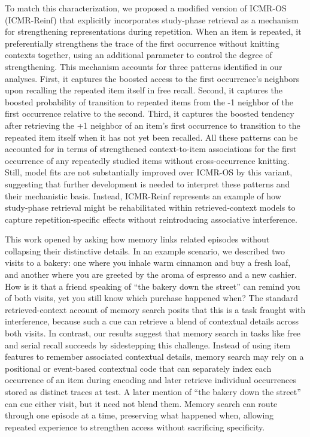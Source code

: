 \documentclass[
  man,
  floatsintext,
  longtable,
  nolmodern,
  notxfonts,
  notimes,
  draftfirst,
  colorlinks=true,linkcolor=blue,citecolor=blue,urlcolor=blue]{apa7}
\begin{document}
To match this characterization, we proposed a modified version of
ICMR-OS (ICMR-Reinf) that explicitly incorporates study-phase retrieval
as a mechanism for strengthening representations during repetition. When
an item is repeated, it preferentially strengthens the trace of the
first occurrence without knitting contexts together, using an additional
parameter to control the degree of strengthening. This mechanism
accounts for three patterns identified in our analyses. First, it
captures the boosted access to the first occurrence's neighbors upon
recalling the repeated item itself in free recall. Second, it captures
the boosted probability of transition to repeated items from the -1
neighbor of the first occurrence relative to the second. Third, it
captures the boosted tendency after retrieving the +1 neighbor of an
item's first occurrence to transition to the repeated item itself when
it has not yet been recalled. All these patterns can be accounted for in
terms of strengthened context-to-item associations for the first
occurrence of any repeatedly studied items without cross-occurrence
knitting. Still, model fits are not substantially improved over ICMR-OS
by this variant, suggesting that further development is needed to
interpret these patterns and their mechanistic basis. Instead,
ICMR-Reinf represents an example of how study-phase retrieval might be
rehabilitated within retrieved-context models to capture
repetition-specific effects without reintroducing associative
interference.

This work opened by asking how memory links related episodes without
collapsing their distinctive details. In an example scenario, we
described two visits to a bakery: one where you inhale warm cinnamon and
buy a fresh loaf, and another where you are greeted by the aroma of
espresso and a new cashier. How is it that a friend speaking of ``the
bakery down the street'' can remind you of both visits, yet you still
know which purchase happened when? The standard retrieved-context
account of memory search posits that this is a task fraught with
interference, because such a cue can retrieve a blend of contextual
details across both visits. In contrast, our results suggest that memory
search in tasks like free and serial recall succeeds by sidestepping
this challenge. Instead of using item features to remember associated
contextual details, memory search may rely on a positional or
event-based contextual code that can separately index each occurrence of
an item during encoding and later retrieve individual occurrences stored
as distinct traces at test. A later mention of ``the bakery down the
street'' can cue either visit, but it need not blend them. Memory search
can route through one episode at a time, preserving what happened when,
allowing repeated experience to strengthen access without sacrificing
specificity.
\end{document}

